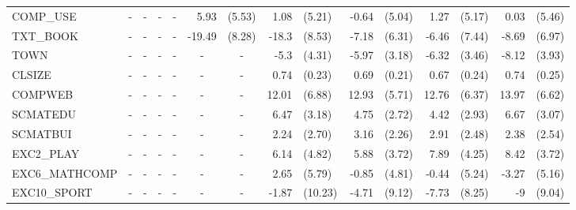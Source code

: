 \documentclass[10pt]{article}
\begin{document}
\begin{table}[htbp]
\begin{tabular}{lrlrlrlrlrlrlrl}
    COMP\_USE & \multicolumn{1}{c}{-} & \multicolumn{1}{c}{-} & \multicolumn{1}{c}{-} & \multicolumn{1}{c}{-} & 5.93  & (5.53) & 1.08  & (5.21) & -0.64 & (5.04) & 1.27  & (5.17) & 0.03  & (5.46) \\
    TXT\_BOOK & \multicolumn{1}{c}{-} & \multicolumn{1}{c}{-} & \multicolumn{1}{c}{-} & \multicolumn{1}{c}{-} & -19.49 & (8.28) & -18.3 & (8.53) & -7.18 & (6.31) & -6.46 & (7.44) & -8.69 & (6.97) \\
    TOWN  & \multicolumn{1}{c}{-} & \multicolumn{1}{c}{-} & \multicolumn{1}{c}{-} & \multicolumn{1}{c}{-} & \multicolumn{1}{c}{-} & \multicolumn{1}{c}{-} & -5.3  & (4.31) & -5.97 & (3.18) & -6.32 & (3.46) & -8.12 & (3.93) \\
    CLSIZE & \multicolumn{1}{c}{-} & \multicolumn{1}{c}{-} & \multicolumn{1}{c}{-} & \multicolumn{1}{c}{-} & \multicolumn{1}{c}{-} & \multicolumn{1}{c}{-} & 0.74  & (0.23) & 0.69  & (0.21) & 0.67  & (0.24) & 0.74  & (0.25) \\
    COMPWEB & \multicolumn{1}{c}{-} & \multicolumn{1}{c}{-} & \multicolumn{1}{c}{-} & \multicolumn{1}{c}{-} & \multicolumn{1}{c}{-} & \multicolumn{1}{c}{-} & 12.01 & (6.88) & 12.93 & (5.71) & 12.76 & (6.37) & 13.97 & (6.62) \\
    SCMATEDU & \multicolumn{1}{c}{-} & \multicolumn{1}{c}{-} & \multicolumn{1}{c}{-} & \multicolumn{1}{c}{-} & \multicolumn{1}{c}{-} & \multicolumn{1}{c}{-} & 6.47  & (3.18) & 4.75  & (2.72) & 4.42  & (2.93) & 6.67  & (3.07) \\
    SCMATBUI & \multicolumn{1}{c}{-} & \multicolumn{1}{c}{-} & \multicolumn{1}{c}{-} & \multicolumn{1}{c}{-} & \multicolumn{1}{c}{-} & \multicolumn{1}{c}{-} & 2.24  & (2.70) & 3.16  & (2.26) & 2.91  & (2.48) & 2.38  & (2.54) \\
    EXC2\_PLAY & \multicolumn{1}{c}{-} & \multicolumn{1}{c}{-} & \multicolumn{1}{c}{-} & \multicolumn{1}{c}{-} & \multicolumn{1}{c}{-} & \multicolumn{1}{c}{-} & 6.14  & (4.82) & 5.88  & (3.72) & 7.89  & (4.25) & 8.42  & (3.72) \\
    EXC6\_MATHCOMP & \multicolumn{1}{c}{-} & \multicolumn{1}{c}{-} & \multicolumn{1}{c}{-} & \multicolumn{1}{c}{-} & \multicolumn{1}{c}{-} & \multicolumn{1}{c}{-} & 2.65  & (5.79) & -0.85 & (4.81) & -0.44 & (5.24) & -3.27 & (5.16) \\
    EXC10\_SPORT & \multicolumn{1}{c}{-} & \multicolumn{1}{c}{-} & \multicolumn{1}{c}{-} & \multicolumn{1}{c}{-} & \multicolumn{1}{c}{-} & \multicolumn{1}{c}{-} & -1.87 & (10.23) & -4.71 & (9.12) & -7.73 & (8.25) & -9    & (9.04) \\

\end{tabular}
\end{table}
\end{document}
